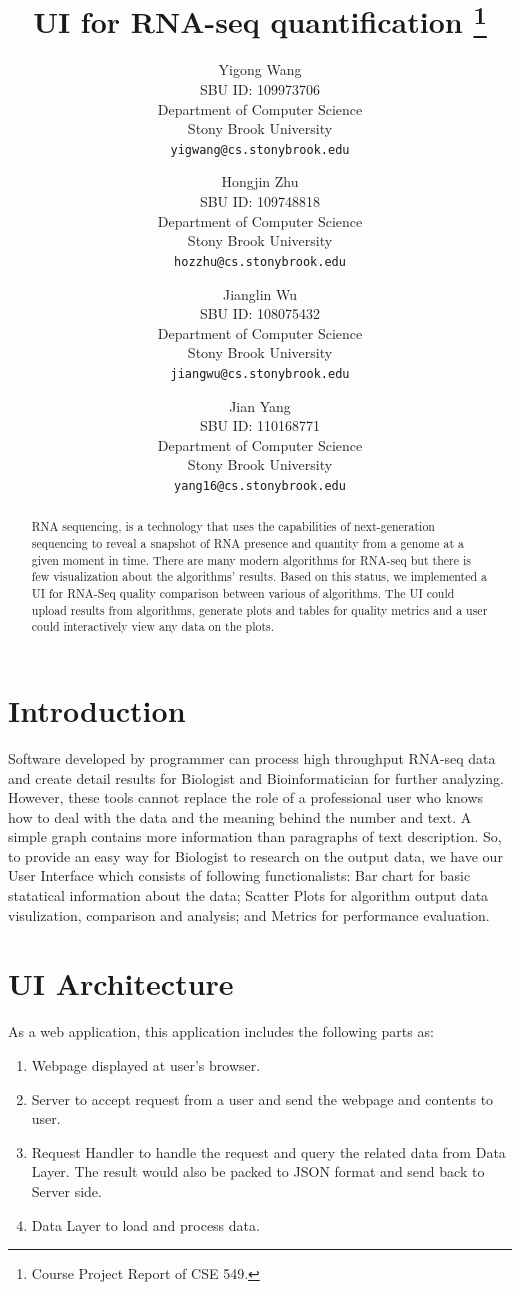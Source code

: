 \documentclass[11pt,letter]{article}
\title{UI for RNA-seq quantification \footnote{Course Project Report of CSE 549.}}
\author{
Yigong Wang\\
       {\small SBU ID: 109973706}\\
       {\small Department of Computer Science}\\
       {\small Stony Brook University} \\
       {\small \texttt{yigwang@cs.stonybrook.edu}}
\and
Hongjin Zhu \\
       {\small SBU ID: 109748818}\\
       {\small Department of Computer Science}\\
       {\small Stony Brook University} \\
       {\small \texttt{hozzhu@cs.stonybrook.edu}}
\and
Jianglin Wu \\
       {\small SBU ID: 108075432}\\
       {\small Department of Computer Science}\\
       {\small Stony Brook University} \\
       {\small \texttt{jiangwu@cs.stonybrook.edu}}
\and
Jian Yang \\
       {\small SBU ID: 110168771}\\
       {\small Department of Computer Science}\\
       {\small Stony Brook University}\\
       {\small \texttt{yang16@cs.stonybrook.edu}}
}
\date{}
\begin{document}
\maketitle

\begin{abstract}
RNA sequencing, is a technology that uses the capabilities of next-generation sequencing to reveal a snapshot of RNA presence and quantity from a genome at a given moment in time. There are many modern algorithms for RNA-seq but there is few visualization about the algorithms' results. Based on this status, we implemented a UI for RNA-Seq quality comparison between various of algorithms. The UI could upload results from algorithms, generate plots and tables for quality metrics and a user could interactively view any data on the plots.
\end{abstract}

\thispagestyle{empty}
\addtocounter{page}{0}

\section {Introduction}

Software developed by programmer can process high throughput RNA-seq data and create detail results for Biologist and Bioinformatician for further analyzing. However, these tools cannot replace the role of a professional user who knows how to deal with the data and the meaning behind the number and text.  A simple graph contains more information than paragraphs of text description.  So, to provide an easy way for Biologist to research on the output data, we have our User Interface which consists of following functionalists: Bar chart for basic statatical information about the data; Scatter Plots for algorithm output data visulization, comparison and analysis; and Metrics for performance evaluation.   \\


\section {UI Architecture}
As a web application, this application includes the following parts as: \\
\begin{enumerate}
\item Webpage displayed at user's browser.
\item Server to accept request from a user and send the webpage and contents to user.
\item Request Handler to handle the request and query the related data from Data Layer. The result would also be packed to JSON format and send back to Server side.
\item Data Layer to load and process data.
\end{enumerate}
\end{document}
